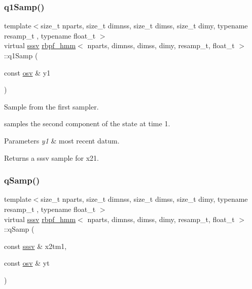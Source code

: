 \subsubsection{\texorpdfstring{q1\+Samp()}{q1Samp()}}
{\footnotesize\ttfamily template$<$size\+\_\+t nparts, size\+\_\+t dimnss, size\+\_\+t dimss, size\+\_\+t dimy, typename resamp\+\_\+t , typename float\+\_\+t $>$ \\
virtual \hyperlink{classrbpf__hmm_a28e8ad1d93bcf53cb74603f74826a81c}{sssv} \hyperlink{classrbpf__hmm}{rbpf\+\_\+hmm}$<$ nparts, dimnss, dimss, dimy, resamp\+\_\+t, float\+\_\+t $>$\+::q1\+Samp (\begin{DoxyParamCaption}\item[{const \hyperlink{classrbpf__hmm_adafd37687fdd3bb776d3d33a5b0e7080}{osv} \&}]{y1 }\end{DoxyParamCaption})\hspace{0.3cm}{\ttfamily [pure virtual]}}



Sample from the first sampler. 

samples the second component of the state at time 1. 
\begin{DoxyParams}{Parameters}
{\em y1} & most recent datum. \\
\hline
\end{DoxyParams}
\begin{DoxyReturn}{Returns}
a sssv sample for x21. 
\end{DoxyReturn}
\mbox{\label{classrbpf__hmm_a449e0c123c92bbe4fedacad65f9ba7be}} 
\subsubsection{\texorpdfstring{q\+Samp()}{qSamp()}}
{\footnotesize\ttfamily template$<$size\+\_\+t nparts, size\+\_\+t dimnss, size\+\_\+t dimss, size\+\_\+t dimy, typename resamp\+\_\+t , typename float\+\_\+t $>$ \\
virtual \hyperlink{classrbpf__hmm_a28e8ad1d93bcf53cb74603f74826a81c}{sssv} \hyperlink{classrbpf__hmm}{rbpf\+\_\+hmm}$<$ nparts, dimnss, dimss, dimy, resamp\+\_\+t, float\+\_\+t $>$\+::q\+Samp (\begin{DoxyParamCaption}\item[{const \hyperlink{classrbpf__hmm_a28e8ad1d93bcf53cb74603f74826a81c}{sssv} \&}]{x2tm1,  }\item[{const \hyperlink{classrbpf__hmm_adafd37687fdd3bb776d3d33a5b0e7080}{osv} \&}]{yt }\end{DoxyParamCaption})\hspace{0.3cm}{\ttfamily [pure virtual]}}



